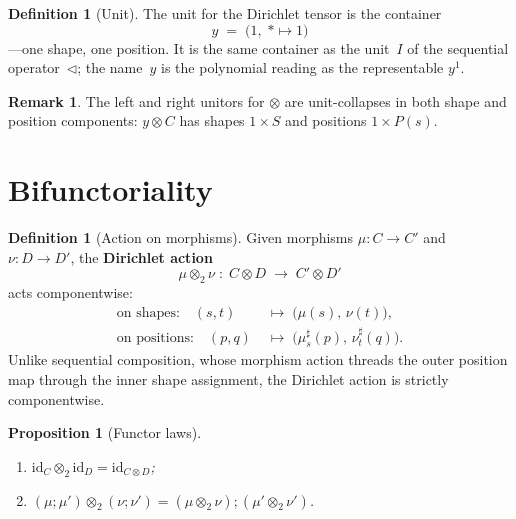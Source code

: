\documentclass[11pt,a4paper]{article}
\theoremstyle{plain}
\newtheorem{proposition}[theorem]{Proposition}
\theoremstyle{definition}
\newtheorem{definition}[theorem]{Definition}
\newtheorem{remark}[theorem]{Remark}
\newcommand{\id}{\mathrm{id}}
\newcommand{\seq}{\mathbin{\triangleleft}}
\newcommand{\Dir}{\mathbin{\otimes}}
\begin{document}
\begin{definition}[Unit]\label{def:y}
The unit for the Dirichlet tensor is the container
\begin{equation}
  y \;=\; \bigl(1,\; {\ast} \mapsto 1\bigr)
\end{equation}
---one shape, one position. It is the same container as the unit~$I$ of
the sequential operator~$\seq$; the name~$y$ is the polynomial reading
as the representable $y^1$.
\end{definition}

\begin{remark}
The left and right unitors for $\Dir$ are unit-collapses in both shape
and position components: $y \Dir C$ has shapes $1 \times S$ and
positions $1 \times P(s)$.
\end{remark}

\section{Bifunctoriality}

\begin{definition}[Action on morphisms]\label{def:dir2}
Given morphisms $\mu : C \to C'$ and $\nu : D \to D'$, the
\textbf{Dirichlet action}
\[
  \mu \Dir_2 \nu
  \;:\;
  C \Dir D \;\longrightarrow\; C' \Dir D'
\]
acts componentwise:
\begin{align}
  \text{on shapes:}\quad
  (s,t) &\;\longmapsto\; \bigl(\mu(s),\, \nu(t)\bigr), \\
  \text{on positions:}\quad
  (p,q) &\;\longmapsto\;
  \bigl(\mu^\sharp_s(p),\, \nu^\sharp_t(q)\bigr).
\end{align}
Unlike sequential composition, whose morphism action threads the outer
position map through the inner shape assignment, the Dirichlet action is
strictly componentwise.
\end{definition}

\begin{proposition}[Functor laws]\label{prop:dir2-laws}
\begin{enumerate}
  \item $\id_C \Dir_2 \id_D = \id_{C \Dir D}$;
  \item $(\mu \mathbin{;}\mu') \Dir_2 (\nu \mathbin{;}\nu')
        = (\mu \Dir_2 \nu) \mathbin{;} (\mu' \Dir_2 \nu')$.
\end{enumerate}
\end{proposition}
\end{document}

